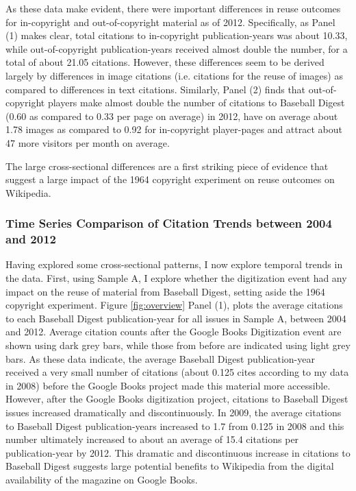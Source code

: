 \documentclass[11pt]{article}
\begin{document}
As these data make evident, there were important differences in reuse outcomes for in-copyright and out-of-copyright material as of 2012. Specifically, as Panel (1) makes clear, total citations to in-copyright publication-years was about 10.33, while out-of-copyright publication-years received almost double the number, for a total of about 21.05 citations. However, these differences seem to be derived largely by differences in image citations (i.e. citations for the reuse of images) as compared to differences in text citations. Similarly, Panel (2) finds that out-of-copyright players make almost double the number of citations to Baseball Digest (0.60 as compared to 0.33 per page on average) in 2012, have on average about 1.78 images as compared to 0.92 for in-copyright player-pages and attract about 47 more visitors per month on average.

The large cross-sectional differences are a first striking piece of evidence that suggest a large impact of the 1964 copyright experiment on reuse outcomes on Wikipedia.

\subsubsection{Time Series Comparison of Citation Trends between 2004 and 2012}

Having explored some cross-sectional patterns,  I now explore temporal trends in the data. First, using Sample A, I explore whether the digitization event had any impact on the reuse of material from Baseball Digest, setting aside the 1964 copyright experiment. Figure \ref{fig:overview} Panel (1), plots the average citations to each Baseball Digest publication-year for all issues in Sample A, between 2004 and 2012. Average citation counts after the Google Books Digitization event are shown using dark grey bars, while those from before are indicated using light grey bars. As these data indicate, the average Baseball Digest publication-year received a very small number of citations (about 0.125 cites according to my data in 2008) before the Google Books project made this material more accessible. However, after the Google Books digitization project, citations to Baseball Digest issues increased dramatically and discontinuously. In 2009, the average citations to Baseball Digest publication-years increased to 1.7 from 0.125 in 2008 and this number ultimately increased to about an average of 15.4 citations per publication-year by 2012. This dramatic and discontinuous increase in citations to Baseball Digest suggests large potential benefits to Wikipedia from the digital availability of the magazine on Google Books.
\end{document}

